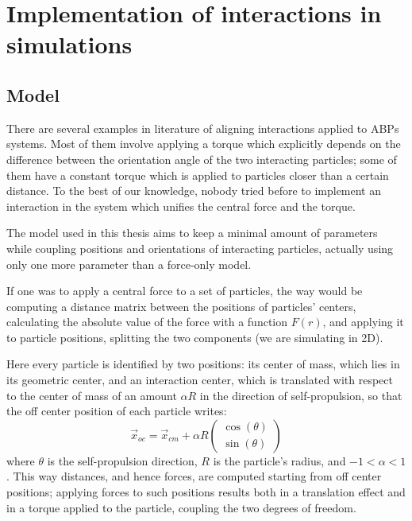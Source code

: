 \documentclass[../../master_thesis_np.tex]{subfiles}
\begin{document}
\chapter[Interaction Implementation]{Implementation of interactions in simulations}
\label{chap:int_impl}
	\section{Model}
	There are several examples in literature of aligning interactions applied to ABPs systems. Most of them involve applying a torque which explicitly depends on the difference between the orientation angle of the two interacting particles; some of them have a constant torque which is applied to particles closer than a certain distance. To the best of our knowledge, nobody tried before to implement an interaction in the system which unifies the central force and the torque. 
	
	The model used in this thesis aims to keep a minimal amount of parameters while coupling positions and orientations of interacting particles, actually using only one more parameter than a force-only model.
	
	If one was to apply a central force to a set of particles, the way would be computing a distance matrix between the positions of particles' centers, calculating the absolute value of the force with a function $F(r)$, and applying it to particle positions, splitting the two components (we are simulating in 2D).
	
	Here every particle is identified by two positions: its center of mass, which lies in its geometric center, and an interaction center, which is translated with respect to the center of mass of an amount $\alpha R$ in the direction of self-propulsion, so that the off center position of each particle writes:
	\begin{equation}
		\vec{x}_{oc} = \vec{x}_{cm} + \alpha R 
		\begin{pmatrix}
			\cos(\theta)\\
			\sin(\theta)
		\end{pmatrix}
	\end{equation}
	where $\theta$ is the self-propulsion direction, $R$ is the particle's radius, and $-1 < \alpha < 1$. This way distances, and hence forces, are computed starting from off center positions; applying forces to such positions results both in a translation effect and in a torque applied to the particle, coupling the two degrees of freedom.
	
\end{document}
